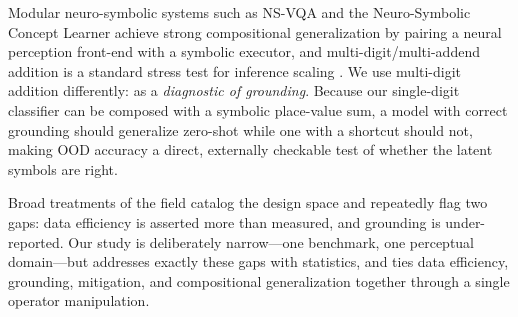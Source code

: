  Modular neuro-symbolic systems such as
NS-VQA \citep{yi2018} and the Neuro-Symbolic Concept Learner \citep{mao2019} achieve strong
compositional generalization by pairing a neural perception front-end with a symbolic executor, and
multi-digit/multi-addend addition is a standard stress test for inference scaling
\citep{manhaeve2018,li2023scallop}. We use multi-digit addition differently: as a \emph{diagnostic of
grounding}. Because our single-digit classifier can be composed with a symbolic place-value sum, a
model with correct grounding should generalize zero-shot while one with a shortcut should not, making
OOD accuracy a direct, externally checkable test of whether the latent symbols are right.

 Broad treatments of the field
\citep{garcez2020,marra2021} catalog the design space and repeatedly flag two gaps: data efficiency is
asserted more than measured, and grounding is under-reported. Our study is deliberately narrow---one
benchmark, one perceptual domain---but addresses exactly these gaps with statistics, and ties data
efficiency, grounding, mitigation, and compositional generalization together through a single operator
manipulation.
